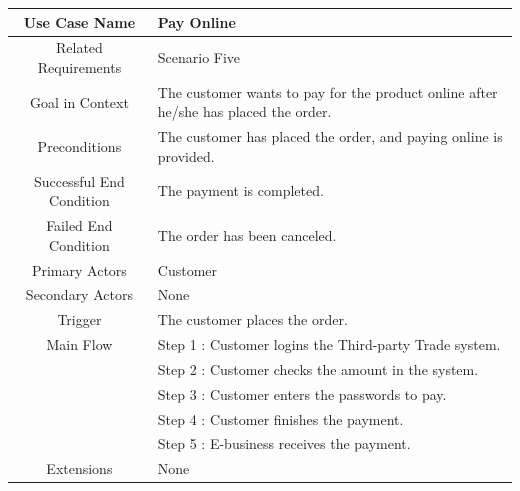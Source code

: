 \documentclass[12pt]{scrreprt}
\begin{document}
\begin{table}
  \centering
  \begin{tabular}{| c | p{11cm} |}
    \hline
    Use Case Name & Pay Online\\
    \hline
    Related Requirements & Scenario Five\\
    \hline
    Goal in Context & The customer wants to pay for the product online after
    he/she has placed the order.\\
    \hline
    Preconditions & The customer has placed the order, and paying online is
    provided.\\
    \hline
    Successful End Condition & The payment is completed.\\
    \hline
    Failed End Condition & The order has been canceled.\\
    \hline
    Primary Actors & Customer\\
    \hline
    Secondary Actors & None\\
    \hline
    Trigger & The customer places the order.\\
    \hline
    Main Flow & Step 1 : Customer logins the Third-party Trade system.\\
    & Step 2 : Customer checks the amount in the system.\\
    & Step 3 : Customer enters the passwords to pay.\\
    & Step 4 : Customer finishes the payment.\\
    & Step 5 : E-business receives the payment.\\
    \hline
    Extensions & None\\
    \hline
  \end{tabular}
\end{table}
\end{document}
